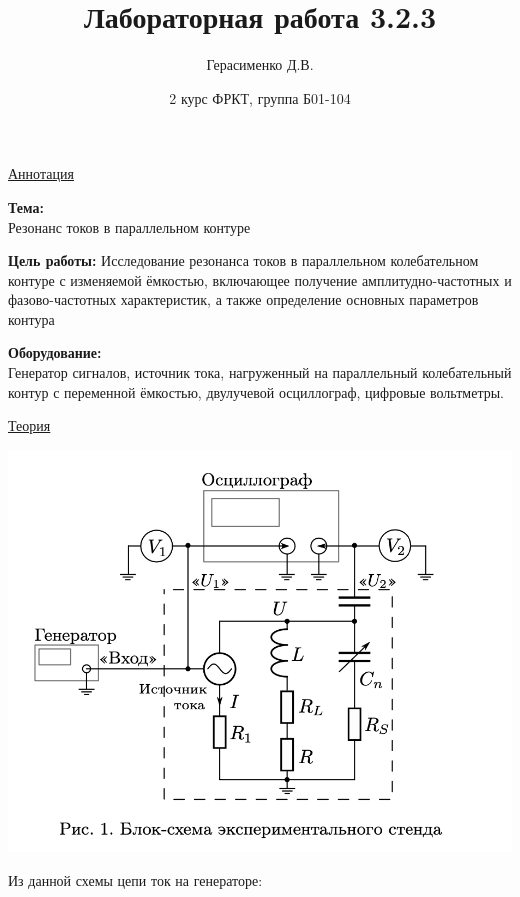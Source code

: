 \documentclass{article}
\title{
    \textbf{Лабораторная работа 3.2.3}
}
\author{Герасименко Д.В.}
\date{2 курс ФРКТ, группа Б01-104}
\begin{document}
\maketitle

\begin{center}
    \raggedleft
        \underline{\underline{\LARGE {Аннотация}}}
\end{center}

\begin{center}
\raggedright
    \large{\textbf{Тема:}}
    \\
    \large {Резонанс токов в параллельном контуре}
    
    \large{\textbf{Цель работы:} Исследование резонанса токов в параллельном колебательном контуре с изменяемой
    ёмкостью, включающее получение амплитудно-частотных и фазово-частотных характеристик, а также определение основных параметров контура}
    \\
    \large {}
    
    \large{\textbf{Оборудование:}}
    \\
    \large{Генератор сигналов, источник тока, нагруженный на параллельный колебательный контур с переменной ёмкостью, двулучевой осциллограф, цифровые вольтметры.}
\end{center}


\begin{center}
    \raggedleft
        \underline{\underline{\LARGE {Теория}}}
\end{center}

\begin{center}
    \includegraphics[width=0.8\linewidth]{im2}
\end{center}

Из данной схемы цепи ток на генераторе:
\end{document}
